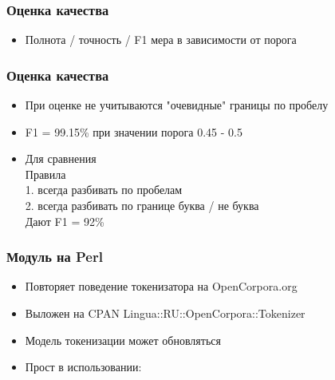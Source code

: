 \documentclass{beamer}
\begin{document}
\begin{frame}
\frametitle{Оценка качества}
\begin{itemize}
\item{Полнота / точность / F1 мера в зависимости от порога}
\begin{figure}
\end{figure}
\end{itemize}
\end{frame}

\begin{frame}
\frametitle{Оценка качества}
\begin{itemize}
\item{При оценке не учитываются "очевидные" границы по пробелу}
\pause
\item{F1 = 99.15\% при значении порога 0.45 - 0.5}
\pause
\item{Для сравнения} \\
Правила \\
1. всегда разбивать по пробелам \\
2. всегда разбивать по границе буква / не буква \\
Дают F1 = 92\%
\end{itemize}
\end{frame}

\begin{frame}
\frametitle{Модуль на Perl}
\begin{itemize}
\item{Повторяет поведение токенизатора на OpenCorpora.org}
\pause
\item{Выложен на CPAN Lingua::RU::OpenCorpora::Tokenizer}
\pause
\item{Модель токенизации может обновляться}
\pause
\item{Прост в использовании:}
\begin{figure}
\end{figure}
\end{itemize}
\end{frame}
\end{document}
